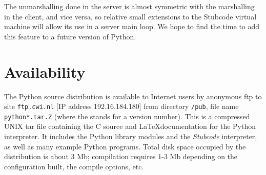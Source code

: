 The unmarshalling done in the server is almost symmetric with the
marshalling in the client, and vice versa, so relative small
extensions to the Stubcode virtual machine will allow its use in a
server main loop.  We hope to find the time to add this feature to a
future version of Python.

\section{Availability}

The Python source distribution is available to Internet users by
anonymous ftp to site {\tt ftp.cwi.nl} [IP address 192.16.184.180]
from directory {\tt /pub}, file name {\tt python*.tar.Z} (where the
{\tt *} stands for a version number).  This is a compressed UNIX tar
file containing the C source and \LaTeX documentation for the Python
interpreter.  It includes the Python library modules and the {\em
Stubcode} interpreter, as well as many example Python programs.  Total
disk space occupied by the distribution is about 3 Mb; compilation
requires 1-3 Mb depending on the configuration built, the compile
options, etc.






